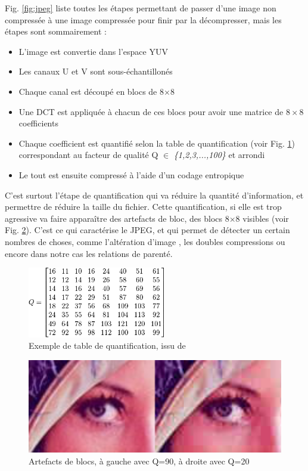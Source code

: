\documentclass[utf8]{stageM2R} %
\begin{document}
Fig. \ref{fig:jpeg} liste toutes les étapes permettant de passer d'une image non compressée à une image compressée pour finir par la décompresser, mais les étapes sont sommairement : 

\begin{itemize}
  \item L'image est convertie dans l'espace YUV
  \item Les canaux U et V sont sous-échantillonés
  \item Chaque canal est découpé en blocs de 8$\times$8
  \item Une DCT est appliquée à chacun de ces blocs pour avoir une matrice de $8\times 8$ coefficients
  \item Chaque coefficient est quantifié selon la table de quantification (voir Fig. \ref{fig:quantization_table}) correspondant au facteur de qualité Q $\in$ \textit{\{1,2,3,...,100\}} et arrondi
  \item Le tout est ensuite compressé à l'aide d'un codage entropique
\end{itemize}

C'est surtout l'étape de quantification qui va réduire la quantité d'information, et permettre de réduire la taille du fichier. Cette quantification, si elle est trop agressive va faire apparaître des artefacts de bloc, des blocs 8$\times$8 visibles (voir Fig. \ref{fig:blocs_artefacts}). C'est ce qui caractérise le JPEG, et qui permet de détecter un certain nombres de choses, comme l'altération d'image \cite{bianchi2012image}, les doubles compressions \cite{bianchi2012detection} ou encore dans notre cas les relations de parenté.

\begin{figure}[H]
  \begin{center}
    \includegraphics[width=60mm]{images/quantization_table.png}
    \caption{Exemple de table de quantification, issu de \cite{jpeg}}
    \label{fig:quantization_table}
  \end{center}
\end{figure}

\begin{figure}[H]
  \begin{center}
    \includegraphics[width=120mm]{images/eyes.png}
    \caption{Artefacts de blocs, à gauche avec Q=90, à droite avec Q=20}
    \label{fig:blocs_artefacts}
  \end{center}
\end{figure}
\end{document}
